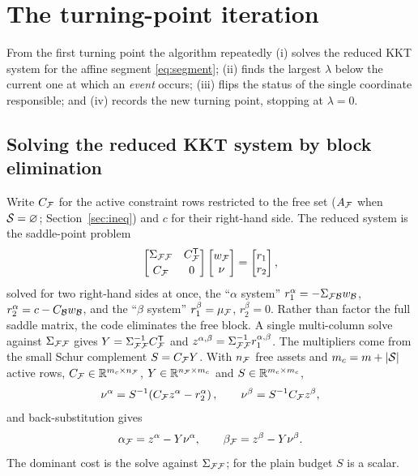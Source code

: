 \section{The turning-point iteration}
\label{sec:iteration}

From the first turning point the algorithm repeatedly (i) solves the reduced KKT system
for the affine segment \eqref{eq:segment}; (ii) finds the largest $\lambda$ below the
current one at which an \emph{event} occurs; (iii) flips the status of the single
coordinate responsible; and (iv) records the new turning point, stopping at
$\lambda = 0$.

\subsection{Solving the reduced KKT system by block elimination}
\label{sec:blockelim}

Write $C_{\mathcal{F}}$ for the active constraint rows restricted to the free set ($A_{\mathcal{F}}$ when
$\mathcal{S} = \varnothing$; Section~\ref{sec:ineq}) and $c$ for their right-hand side. The
reduced system is the saddle-point problem
\begin{equation}
\label{eq:saddle}
\begin{bmatrix} \Sigma_{\mathcal{F}\mathcal{F}} & C_{\mathcal{F}}^{\mathsf{T}} \\[2pt] C_{\mathcal{F}} & 0 \end{bmatrix}
\begin{bmatrix} w_{\mathcal{F}} \\ \nu \end{bmatrix}
=
\begin{bmatrix} r_1 \\ r_2 \end{bmatrix},
\end{equation}
solved for two right-hand sides at once, the ``$\alpha$ system''
$r_1^{\alpha} = -\Sigma_{\mathcal{F}\mathcal{B}} w_{\mathcal{B}}$, $r_2^{\alpha} = c - C_{\mathcal{B}} w_{\mathcal{B}}$, and the
``$\beta$ system'' $r_1^{\beta} = \mu_{\mathcal{F}}$, $r_2^{\beta} = 0$. Rather than factor the
full saddle matrix, the code eliminates the free block. A single multi-column solve
against $\Sigma_{\mathcal{F}\mathcal{F}}$ gives $Y = \Sigma_{\mathcal{F}\mathcal{F}}^{-1} C_{\mathcal{F}}^{\mathsf{T}}$ and
$z^{\alpha,\beta} = \Sigma_{\mathcal{F}\mathcal{F}}^{-1} r_1^{\alpha,\beta}$. The multipliers come from the
small Schur complement $S = C_{\mathcal{F}} Y$. With $n_{\mathcal{F}}$ free assets and $m_c = m + |\mathcal{S}|$ active rows,
$C_{\mathcal{F}} \in \mathbb{R}^{m_c\times n_{\mathcal{F}}}$, $Y \in \mathbb{R}^{n_{\mathcal{F}}\times m_c}$ and $S \in \mathbb{R}^{m_c\times m_c}$,
\begin{equation}
\label{eq:schur}
\nu^{\alpha} = S^{-1}\!\left(C_{\mathcal{F}} z^{\alpha} - r_2^{\alpha}\right),
\qquad
\nu^{\beta} = S^{-1} C_{\mathcal{F}} z^{\beta},
\end{equation}
and back-substitution gives
\begin{equation}
\label{eq:freesoln}
\alpha_{\mathcal{F}} = z^{\alpha} - Y\nu^{\alpha},
\qquad
\beta_{\mathcal{F}} = z^{\beta} - Y\nu^{\beta}.
\end{equation}
The dominant cost is the solve against $\Sigma_{\mathcal{F}\mathcal{F}}$; for the plain budget $S$ is a
scalar.

